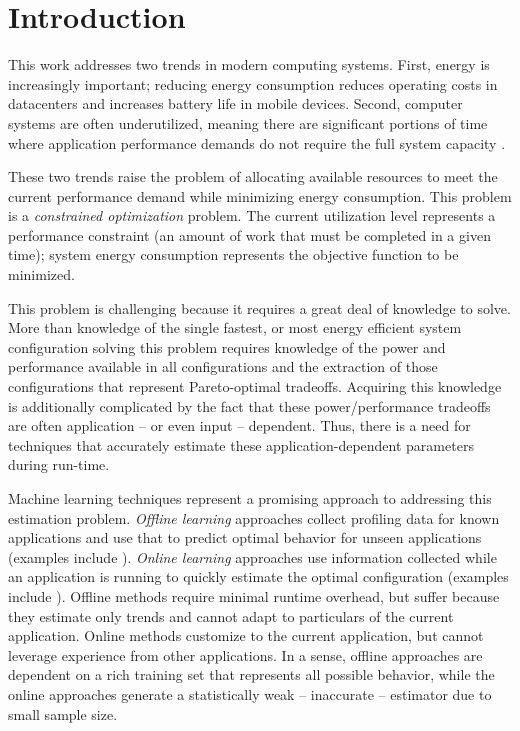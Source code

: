 
\section{Introduction}

This work addresses two trends in modern computing systems.  First,
energy is increasingly important; reducing energy consumption reduces
operating costs in datacenters and increases battery life in mobile
devices.  Second, computer systems are often underutilized, meaning
there are significant portions of time where application performance
demands do not require the full system capacity
\cite{google2007,MeisnerISCA2011}.

These two trends raise the problem of allocating available resources
to meet the current performance demand while minimizing energy
consumption. This problem is a \emph{constrained optimization}
problem. The current utilization level represents a performance
constraint (\ie an amount of work that must be completed in a given
time); system energy consumption represents the objective function to
be minimized.

This problem is challenging because it requires a great deal of
knowledge to solve.  More than knowledge of the single fastest, or
most energy efficient system configuration solving this problem
requires knowledge of the power and performance available in all
configurations and the extraction of those configurations that
represent Pareto-optimal tradeoffs.  Acquiring this knowledge is
additionally complicated by the fact that these power/performance
tradeoffs are often application -- or even input -- dependent.  Thus,
there is a need for techniques that accurately estimate these
application-dependent parameters during run-time.

Machine learning techniques represent a promising approach to
addressing this estimation problem.  \emph{Offline learning}
approaches collect profiling data for known applications and use that
to predict optimal behavior for unseen applications (examples include
\cite{Yi2003,Koala,LeeBrooks2006,CPR,ChenJohn2011}).  \emph{Online
  learning} approaches use information collected while an application
is running to quickly estimate the optimal configuration (examples
include
\cite{Li2006,Flicker,ParallelismDial,Ponamarev,petabricksDynamic,LeeBrooks,TAAS}).
Offline methods require minimal runtime overhead, but suffer because
they estimate only trends and cannot adapt to particulars of the
current application.  Online methods customize to the current
application, but cannot leverage experience from other applications.
In a sense, offline approaches are dependent on a rich training set
that represents all possible behavior, while the online approaches
generate a statistically weak -- \ie inaccurate -- estimator due to
small sample size.

